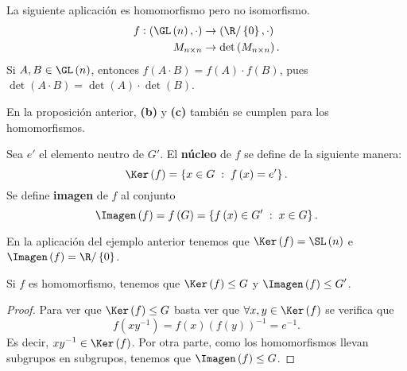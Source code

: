 \begin{eg}
\normalfont La siguiente aplicación es homomorfismo pero no isomorfismo.
\[
\begin{split}
	f : \left(\GL\left(n\right), \cdot \right) & \to \left(\R/ \left\{ 0\right\} , \cdot\right)\\
	M_{n\times n} & \to \det\left(M_{n \times n}\right).
\end{split}
\]
Si $\displaystyle A, B \in \GL\left(n\right) $, entonces $\displaystyle f\left(A \cdot B\right) = f\left(A\right) \cdot f\left(B\right) $, pues $\displaystyle \det\left(A \cdot B\right) = \det\left(A\right) \cdot \det \left(B\right) $. 
\end{eg}
\begin{observation}
\normalfont En la proposición anterior, \textbf{(b)} y \textbf{(c)} también se cumplen para los homomorfismos.   
\end{observation}

\begin{fdefinition}
\normalfont Sea $\displaystyle e' $ el elemento neutro de $\displaystyle G' $. El \textbf{núcleo} de $\displaystyle f $ se define de la siguiente manera:
\[\Ker\left(f\right) = \left\{ x \in G \; : \; f\left(x\right) = e'\right\}  .\]
Se define \textbf{imagen} de $\displaystyle f $ al conjunto
\[\Imagen\left(f\right) = f\left(G\right) = \left\{f\left(x\right) \in G'\; : \; x \in G\right\} .\]
\end{fdefinition}

\begin{eg}
	\normalfont En la aplicación del ejemplo anterior tenemos que $\displaystyle \Ker\left(f\right) = \SL\left(n\right) $ e $\displaystyle \Imagen\left(f\right)=\R/ \left\{ 0\right\}  $.
\end{eg}

\begin{fprop}[]
\normalfont Si $\displaystyle f $ es homomorfismo, tenemos que $\displaystyle \Ker\left(f\right) \leq G $ y $\displaystyle \Imagen\left(f\right) \leq G' $.
\end{fprop}

\begin{proof}
Para ver que $\displaystyle \Ker\left(f\right) \leq G $ basta ver que $\displaystyle \forall x,y \in \Ker\left(f\right) $ se verifica que 
\[f\left(xy^{-1}\right)=f\left(x\right)\left(f\left(y\right)\right)^{-1}=e^{-1} .\]
Es decir, $\displaystyle xy^{-1} \in \Ker\left(f\right) $. Por otra parte, como los homomorfismos llevan subgrupos en subgrupos, tenemos que $\displaystyle \Imagen\left(f\right) \leq G $.
\end{proof}

